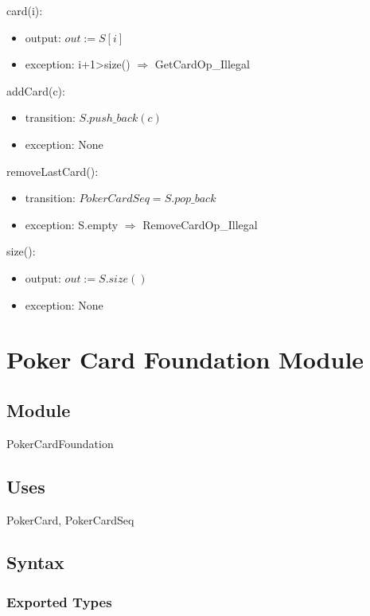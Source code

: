 \documentclass[12pt]{article}
\begin{document}
\noindent card(i):
\begin{itemize}
\item output: $out := S[i]$
\item exception: i+1>size() $\Rightarrow$ GetCardOp\_Illegal
\end{itemize}

\noindent addCard(c):
\begin{itemize}
\item transition: $S.push\_back(c)$
\item exception: None
\end{itemize}

\noindent removeLastCard():
\begin{itemize}
\item transition: $PokerCardSeq=S.pop\_back$
\item exception: S.empty $\Rightarrow$ RemoveCardOp\_Illegal
\end{itemize}

\noindent size():
\begin{itemize}
\item output: $out := S.size()$
\item exception: None
\end{itemize}

\newpage
\section* {Poker Card Foundation Module}

\subsection*{Module}

PokerCardFoundation

\subsection* {Uses}

PokerCard, PokerCardSeq

\subsection* {Syntax}

\subsubsection* {Exported Types}
\end{document}
